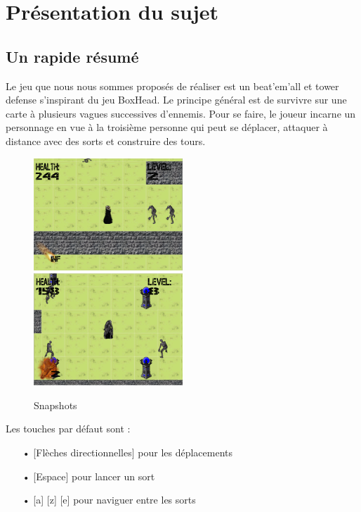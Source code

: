 \section{Présentation du sujet} %

\subsection{Un rapide résumé}
Le jeu que nous nous sommes proposés de réaliser est un beat’em’all et tower defense s’inspirant du jeu BoxHead. Le
principe général est de survivre sur une carte à plusieurs vagues successives d’ennemis. Pour se faire,
le joueur incarne un personnage en vue à la troisième personne qui peut se déplacer, attaquer à distance avec des sorts 
et construire des tours.

\begin{figure}[!ht]
    \includegraphics[width=0.5\textwidth]{./images/snapshot1.png}
    \includegraphics[width=0.5\textwidth]{./images/snapshot2.png}
    \caption{Snapshots}
\end{figure}

Les touches par défaut sont :
\begin{itemize}
\item[•][Flèches directionnelles] pour les déplacements
\item[•][Espace] pour lancer un sort
\item[•][a] [z] [e] pour naviguer entre les sorts
\end{itemize}
